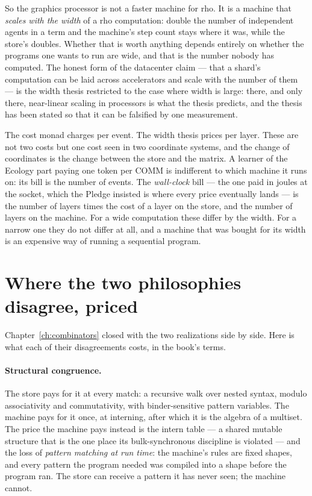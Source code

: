 So the graphics processor is not a faster machine for rho. It is a machine that
\emph{scales with the width} of a rho computation: double the number of independent agents
in a term and the machine's step count stays where it was, while the store's doubles.
Whether that is worth anything depends entirely on whether the programs one wants to run
are wide, and that is the number nobody has computed. The honest form of the datacenter
claim --- that a shard's computation can be laid across accelerators and scale with the
number of them --- is the width thesis restricted to the case where width is large: there,
and only there, near-linear scaling in processors is what the thesis predicts, and the
thesis has been stated so that it can be falsified by one measurement.

\begin{remark}
\label{pr:rmk:ledgers}
The cost monad charges per event. The width thesis prices per layer. These are not two
costs but one cost seen in two coordinate systems, and the change of coordinates is the
change between the store and the matrix. A learner of the Ecology part paying one token per
COMM is indifferent to which machine it runs on: its bill is the number of events. The
\emph{wall-clock} bill --- the one paid in joules at the socket, which the Pledge insisted
is where every price eventually lands --- is the number of layers times the cost of a
layer on the store, and the number of layers on the machine. For a wide computation these
differ by the width. For a narrow one they do not differ at all, and a machine that was
bought for its width is an expensive way of running a sequential program.
\end{remark}

\section{Where the two philosophies disagree, priced}
\label{pr:sec:priced}

Chapter~\ref{ch:combinators} closed with the two realizations side by side. Here is what
each of their disagreements costs, in the book's terms.

\paragraph{Structural congruence.} The store pays for it at every match: a recursive walk
over nested syntax, modulo associativity and commutativity, with binder-sensitive pattern
variables. The machine pays for it once, at interning, after which it is the algebra of a
multiset. The price the machine pays instead is the intern table --- a shared mutable
structure that is the one place its bulk-synchronous discipline is violated --- and the
loss of \emph{pattern matching at run time}: the machine's rules are fixed shapes, and
every pattern the program needed was compiled into a shape before the program ran. The
store can receive a pattern it has never seen; the machine cannot.

